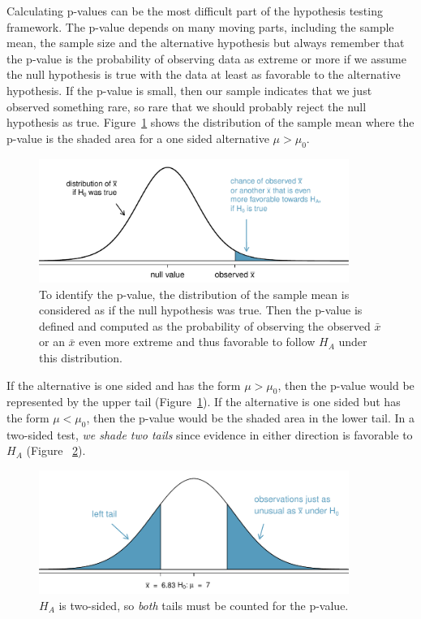 
Calculating p-values can be the most difficult part of the hypothesis testing framework. The p-value depends on many moving parts, including the sample mean, the sample size and the alternative hypothesis but always remember that the p-value is the probability of observing data as extreme or more if we assume the null hypothesis is true with the data at least as favorable to the alternative hypothesis. If the p-value is small, then our sample indicates that we just observed something rare, so rare that we should probably reject the null hypothesis as true. Figure~\ref{pValueOneSidedSleepStudyExplained} shows the distribution of the sample mean where the p-value is the shaded area for a one sided alternative $\mu > \mu_0$. 

\begin{figure}[ht]
   \centering
   \includegraphics[width=0.9\textwidth]{ch_inference_foundations_oi_biostat/figures/pValueOneSidedSleepStudyExplained/pValueOneSidedSleepStudyExplained}
   \caption{To identify the p-value, the distribution of the sample mean is considered as if the null hypothesis was true. Then the p-value is defined and computed as the probability of observing the observed $\bar{x}$ or an $\bar{x}$ even more extreme and thus favorable to follow $H_A$ under this distribution.} 
   \label{pValueOneSidedSleepStudyExplained}
\end{figure}

If the alternative is one sided and has the form $\mu > \mu_0$, then the p-value would be represented by the upper tail (Figure~\ref{pValueOneSidedSleepStudyExplained}). If the alternative is one sided but has the form $\mu < \mu_0$, then the p-value would be the shaded area in the lower tail. In a two-sided test, \emph{we shade two tails} since evidence in either direction is favorable to $H_A$ (Figure ~\ref{2ndSchSleepHTExample}). 

\begin{figure}
   \centering
   \includegraphics[width=0.9\textwidth]{ch_inference_foundations_oi_biostat/figures/2ndSchSleepHTExample/2ndSchSleepHTExample}
   \caption{$H_A$ is two-sided, so \emph{both} tails must be counted for the p-value.}
   \label{2ndSchSleepHTExample}
\end{figure}

